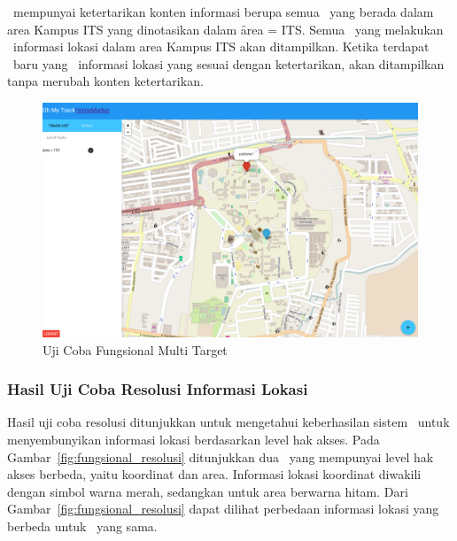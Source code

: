 \Subscriber~mempunyai ketertarikan konten informasi berupa semua \publisher~yang
berada dalam area Kampus ITS yang dinotasikan dalam \f{area = ITS}. Semua
\publisher~yang melakukan \publish~informasi lokasi dalam area Kampus ITS akan
ditampilkan. Ketika terdapat \publisher~baru yang \publish~informasi lokasi yang
sesuai dengan ketertarikan, akan ditampilkan tanpa merubah konten ketertarikan.

\noindent
\begin{figure}
  \centering
  \includegraphics[scale=0.25]
	{images/4-fungsional-multi.png}
  \caption{Uji Coba Fungsional Multi Target}
\label{fig:fungsional_multi}
\end{figure}


\subsubsection{Hasil Uji Coba Resolusi Informasi Lokasi}

Hasil uji coba resolusi ditunjukkan untuk mengetahui keberhasilan sistem
\tracking~untuk menyembunyikan informasi lokasi berdasarkan level hak akses.
Pada Gambar~\ref{fig:fungsional_resolusi} ditunjukkan dua \subscriber~yang
mempunyai level hak akses berbeda, yaitu koordinat dan area. Informasi lokasi
koordinat diwakili dengan simbol warna merah, sedangkan untuk area berwarna
hitam. Dari Gambar~\ref{fig:fungsional_resolusi} dapat dilihat perbedaan
informasi lokasi yang berbeda untuk \publisher~yang sama.

